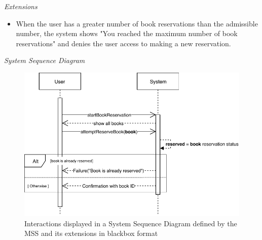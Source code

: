 \textsl{Extensions}
\begin{itemize}[noitemsep]
	\item When the user has a greater number of book reservations than the admissible number, the system shows "You reached the maximum number of book reservations" and denies the user access to making a new reservation.
\end{itemize}
\textsl{System Sequence Diagram}
\begin{figure}[H]
	\centering
	\includegraphics[scale=1]{uml/SD-bb-reserve.pdf}
	\caption*{Interactions displayed in a System Sequence Diagram defined by the MSS and its extensions in blackbox format}
\end{figure}